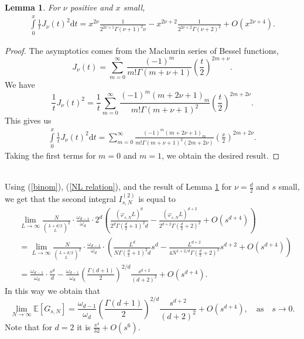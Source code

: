 \documentclass[a4paper,11pt]{amsart}
\newtheorem{lemma}{Lemma}
\begin{document}
\begin{lemma}\label{Integral expansion}
   For $\nu$ positive and $x$ small,
\begin{align*}
    \int\limits_0^{x} \frac{1}{t}J_{\nu}(t)^2\mathrm{d}t=x^{2\nu}\frac{1}{ 2^{2\nu+1}\Gamma(\nu+1)^2\nu}-x^{2\nu+2}\frac{1}{2^{2\nu+2}\Gamma(\nu+2)^2}+O(x^{2\nu+4}).
\end{align*}   

\end{lemma}
\begin{proof}
The asymptotics comes from the Maclaurin series of Bessel functions,
$$J_{\nu}(t)=\sum\limits_{m=0}^\infty \frac{(-1)^m}{m! \Gamma(m+\nu+1)}\left(\frac{t}{2}\right)^{2m+\nu}.$$
We have 
$$\frac{1}{t} J_{\nu}(t)^2=\frac{1}{t}\sum\limits_{m=0}^\infty \frac{(-1)^m (m+2\nu+1)_m}{m! \Gamma(m+\nu+1)^2}\left(\frac{t}{2}\right)^{2m+2\nu}.$$
This gives us 
\begin{align*}
     \int\limits_0^{x} \frac{1}{t}J_{\nu}(t)^2\mathrm{d}t=\sum\limits_{m=0}^\infty \frac{(-1)^m (m+2\nu+1)_m}{m! \Gamma(m+\nu+1)^2(2m+2\nu)}\left(\frac{x}{2}\right)^{2m+2\nu}.
\end{align*}
Taking the first terms for $m=0$ and $m=1$, we obtain the desired result.
\end{proof}
\quad
\\
Using (\ref{binom}), (\ref{NL relation}), and the result of Lemma \ref{Integral expansion} for $\nu=\frac{d}{2}$ and $s$ small, we get that the second integral $I^{(2)}_{s,N}$ is equal to
\begin{align*}
   &\lim\limits_{L\rightarrow\infty}\frac{N}{\binom{L+d/2}{L}^2}\cdot\frac{\omega_{d-1}}{\omega_d}\cdot2^d\left(\frac{(\varphi_{s,N}L)^d}{ 2^{d}\Gamma(\frac{d}{2}+1)^2 d}-\frac{(\varphi_{s,N}L)^{d+2}}{2^{d+2}\Gamma(\frac{d}{2}+2)^2}+O(s^{d+4})\right)
    \\ &=\lim\limits_{L\rightarrow\infty} \frac{N}{\binom{L+d/2}{L}^2}\cdot\frac{\omega_{d-1}}{\omega_d}\cdot\left(\frac{L^d}{N \Gamma(\frac{d}{2}+1)^2 d}s^d-\frac{L^{d+2}}{4N^{1+2/d}\Gamma(\frac{d}{2}+2)^2}s^{d+2}+O(s^{d+4})\right)\\
    &=\frac{\omega_{d-1}}{\omega_d}\cdot\frac{s^d}{d}-\frac{\omega_{d-1}}{\omega_d} \left(\frac{\Gamma(d+1)}{2}\right)^{2/d}\frac{s^{d+2}}{(d+2)^2}+O(s^{d+4}).
\end{align*}
In this way we obtain that
$$\lim\limits_{N\rightarrow \infty}\mathbb{E}[G_{s,N}]=\frac{\omega_{d-1}}{\omega_d} \left(\frac{\Gamma(d+1)}{2}\right)^{2/d}\frac{s^{d+2}}{(d+2)^2}+O(s^{d+4}),\quad \text{as}\quad s\rightarrow 0.$$
Note that for $d=2$ it is $\frac{s^4}{32}+O(s^6)$.
\end{document}
